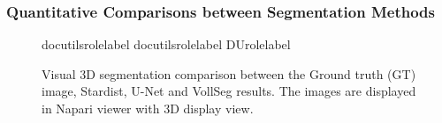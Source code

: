 \documentclass[letterpaper,compsoc,twoside,onecolumn]{IEEEtran}
\providecommand*{\DUrole}[2]{%
  \ifcsname docutilsrole#1\endcsname%
    \csname docutilsrole#1\endcsname{#2}%
  \else
    \csname DUrole#1\endcsname{#2}%
  \fi%
}
\newenvironment{DUlegend}{\small}{}
\begin{document}
\subsubsection{Quantitative Comparisons between Segmentation Methods%
  \label{quantitative-comparisons-between-segmentation-methods}%
}
\begin{figure}[]\noindent{}
\caption{Visual 3D segmentation comparison between the Ground truth (GT) image, Stardist, U-Net and VollSeg results. The images are displayed in Napari viewer with 3D display view.}
\begin{DUlegend}

\DUrole{label}{visseg}\end{DUlegend}
\end{figure}
\end{document}
